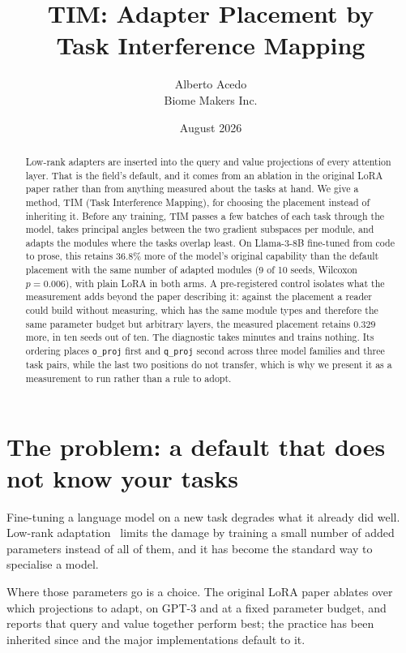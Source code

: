 \documentclass[11pt]{article}
\title{\textbf{TIM: Adapter Placement by\\Task Interference Mapping}}
\author{Alberto Acedo\\ \small Biome Makers Inc.}
\date{August 2026}
\begin{document}
\maketitle

\begin{abstract}
\noindent Low-rank adapters are inserted into the query and value projections of
every attention layer. That is the field's default, and it comes from an
ablation in the original LoRA paper rather than from anything measured about the
tasks at hand. We give a method, TIM (Task Interference Mapping), for choosing the placement
instead of inheriting it. Before any training, TIM passes a few batches of each
task through the model, takes principal angles between the two gradient
subspaces per module, and adapts the modules where the tasks overlap least. On Llama-3-8B fine-tuned from code to
prose, this retains $36.8\%$ more of the model's original capability than the
default placement with the same number of adapted modules (9 of 10 seeds,
Wilcoxon $p = 0.006$), with plain LoRA in both arms. A pre-registered control
isolates what the measurement adds beyond the paper describing it: against the
placement a reader could build without measuring, which has the same module types
and therefore the same parameter budget but arbitrary layers, the measured
placement retains $0.329$ more, in ten seeds out of ten. The diagnostic takes minutes
and trains nothing. Its ordering places \texttt{o\_proj} first and
\texttt{q\_proj} second across three model families and three task pairs, while
the last two positions do not transfer, which is why we present it as a
measurement to run rather than a rule to adopt.
\end{abstract}

\section{The problem: a default that does not know your tasks}

Fine-tuning a language model on a new task degrades what it already did well.
Low-rank adaptation~\cite{hu2022} limits the damage by training a small number
of added parameters instead of all of them, and it has become the standard way
to specialise a model.

Where those parameters go is a choice. The original LoRA paper ablates over
which projections to adapt, on GPT-3 and at a fixed parameter budget, and
reports that query and value together perform best; the practice has been
inherited since and the major implementations default to it.
\end{document}
